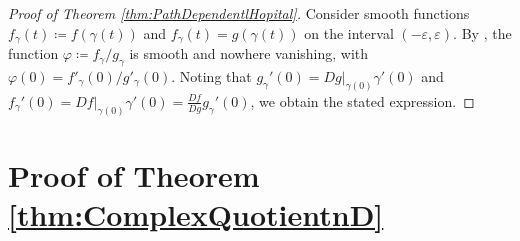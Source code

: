 \documentclass{article}
\newcommand{\COMMENT}[3]{\begingroup\color{#2}\textbf{#1: }#3\endgroup}
\newcommand{\TODO}[1]{\COMMENT{TODO: }{red}{#1}}
\theoremstyle{theorem}
\theoremstyle{definition}
\def\CC{\mathbb{C}}
\def\bx{\mathbf{x}}
\def\by{\mathbf{y}}
\def\bzero{\mathbf{0}}
\begin{document}
\begin{proof}[Proof of Theorem \ref{thm:PathDependentlHopital}]
    Consider smooth functions $f_\gamma(t)\coloneqq f(\gamma(t))$ and $f_\gamma(t)=g(\gamma(t))$ on the interval $(-\varepsilon,\varepsilon)$. 
    By ,
    the function $\varphi\coloneqq  f_\gamma/ g_\gamma$ is smooth and nowhere vanishing, with $\varphi(0)=f'_\gamma(0)/g'_\gamma(0)$.
    Noting that $g_\gamma'(0)=Dg|_{\gamma(0)}\gamma'(0)$ and $f_\gamma'(0)=Df|_{\gamma(0)}\gamma'(0)= \frac{Df}{Dg} g_\gamma'(0)$, we obtain the stated expression.
\end{proof}

\section{Proof of Theorem \ref{thm:ComplexQuotientnD}}\label{app:proof_ ComplexQuotientnD}







\end{document}
